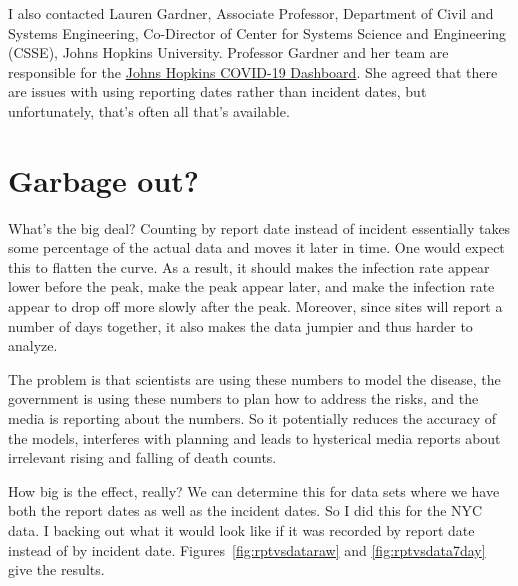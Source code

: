 \documentclass[10pt,reqno]{amsart}
\begin{document}



I also contacted Lauren Gardner, Associate Professor, Department of
Civil and Systems Engineering, Co-Director of Center for Systems
Science and Engineering (CSSE), Johns Hopkins University.  Professor
Gardner and her team are responsible for the
\href{https://coronavirus.jhu.edu/map.html}{Johns Hopkins COVID-19
  Dashboard}.  She agreed that there are issues with using reporting
dates rather than incident dates, but unfortunately, that's often all
that's available.\cite{Gardner2020Dates}


\section{Garbage out?}

What's the big deal?  Counting by report date instead of incident
essentially takes some percentage of the actual data and moves it
later in time.  One would expect this to flatten the curve.  As a
result, it should makes the infection rate appear lower before the
peak, make the peak appear later, and make the infection rate appear
to drop off more slowly after the peak.  Moreover, since sites will
report a number of days together, it also makes the data jumpier and
thus harder to analyze.

The problem is that scientists are using these numbers to model the
disease, the government is using these numbers to plan
how to address the risks, and the media is reporting about the
numbers.  So it potentially reduces the accuracy of the models, interferes with
planning and leads to hysterical media reports about irrelevant rising
and falling of death counts.

How big is the effect, really?  We can determine this for data sets
where we have both the report dates as well as the incident dates.  So
I did this for the NYC data.  I backing out what it would look like if
it was recorded by report date instead of by incident date.
Figures~\ref{fig:rptvsdataraw} and \ref{fig:rptvsdata7day} give the
results.
\end{document}
